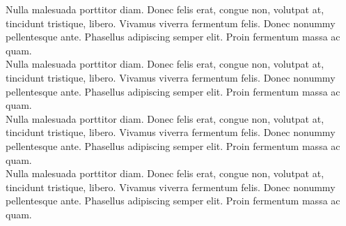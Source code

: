 \documentclass[theme]{si_template/en_cv}
\begin{document}
\begin{paracol}{2}
\begin{rightcolumn}
            \vspace{\sectionspace}
            {Nulla malesuada porttitor diam. Donec felis erat, congue non, volutpat at, tincidunt tristique, libero. Vivamus viverra fermentum felis. Donec nonummy pellentesque ante. Phasellus adipiscing semper elit. Proin fermentum massa ac quam.}
            \vspace{\itemspace}\\
            {Nulla malesuada porttitor diam. Donec felis erat, congue non, volutpat at, tincidunt tristique, libero. Vivamus viverra fermentum felis. Donec nonummy pellentesque ante. Phasellus adipiscing semper elit. Proin fermentum massa ac quam.}
            \vspace{\itemspace}\\
            {Nulla malesuada porttitor diam. Donec felis erat, congue non, volutpat at, tincidunt tristique, libero. Vivamus viverra fermentum felis. Donec nonummy pellentesque ante. Phasellus adipiscing semper elit. Proin fermentum massa ac quam.}
            \vspace{\itemspace}\\
            {Nulla malesuada porttitor diam. Donec felis erat, congue non, volutpat at, tincidunt tristique, libero. Vivamus viverra fermentum felis. Donec nonummy pellentesque ante. Phasellus adipiscing semper elit. Proin fermentum massa ac quam.}


\end{rightcolumn}
\end{paracol}
\end{document}
